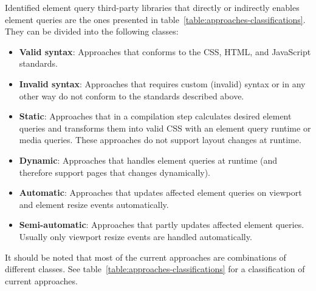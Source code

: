 \documentclass[a4paper,11pt]{kth-mag}
\begin{document}
    Identified element query third-party libraries that directly or indirectly enables element queries are the ones presented in table~\ref{table:approaches-classifications}.
    They can be divided into the following classes:
    \begin{itemize}
      \item \textbf{Valid syntax}: Approaches that conforms to the \gls{CSS}, \gls{HTML}, and \gls{JavaScript} standards.
      \item \textbf{Invalid syntax}: Approaches that requires custom (invalid) syntax or in any other way do not conform to the standards described above.
      \item \textbf{Static}: Approaches that in a compilation step calculates desired element queries and transforms them into valid \gls{CSS} with an element query runtime or media queries. These approaches do not support layout changes at runtime.
      \item \textbf{Dynamic}: Approaches that handles element queries at runtime (and therefore support pages that changes dynamically).
      \item \textbf{Automatic}: Approaches that updates affected element queries on viewport and element resize events automatically.
      \item \textbf{Semi-automatic}: Approaches that partly updates affected element queries. Usually only viewport resize events are handled automatically.
    \end{itemize}
    It should be noted that most of the current approaches are combinations of different classes.
    See table~\ref{table:approaches-classifications} for a classification of current approaches.
\end{document}
